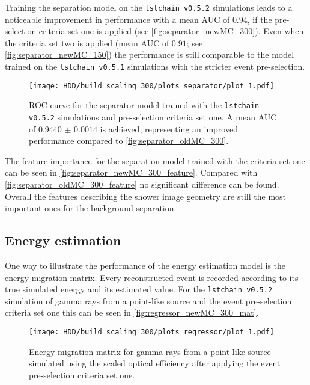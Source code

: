 Training the separation model on the \texttt{lstchain v0.5.2} simulations leads to a noticeable improvement in performance with a mean AUC of $\num{0.94}$, 
if the pre-selection criteria set one is applied (see \autoref{fig:separator_newMC_300}). 
Even when the criteria set two is applied (mean AUC of $\num{0.91}$; see \autoref{fig:separator_newMC_150}) 
the performance is still comparable to the model trained on the \texttt{lstchain v0.5.1} simulations with the stricter event pre-selection.
\begin{figure}
    \centering
    \texttt{[image: HDD/build\_scaling\_300/plots\_separator/plot\_1.pdf]}
    \caption{ROC curve for the separator model trained with the \texttt{lstchain v0.5.2} simulations and pre-selection criteria set one.
        A mean AUC of $\num{0.9440(14)}$ is achieved, representing an improved performance compared to \autoref{fig:separator_oldMC_300}.
    }
    \label{fig:separator_newMC_300}
\end{figure}

The feature importance for the separation model trained with the criteria set one can be seen in \autoref{fig:separator_newMC_300_feature}.
Compared with \autoref{fig:separator_oldMC_300_feature} no significant difference can be found.
Overall the features describing the shower image geometry are still the most important ones for the background separation.


\subsection{Energy estimation}
One way to illustrate the performance of the energy estimation model is the energy migration matrix.
Every reconstructed event is recorded according to its true simulated energy and its estimated value.
For the \texttt{lstchain v0.5.2} simulation of gamma rays from a point-like source and the event pre-selection criteria set one this can be seen in 
\autoref{fig:regressor_newMC_300_mat}.
\begin{figure}
    \centering
    \texttt{[image: HDD/build\_scaling\_300/plots\_regressor/plot\_1.pdf]}
    \caption{Energy migration matrix for gamma rays from a point-like source simulated using the scaled optical efficiency after applying the 
        event pre-selection criteria set one.
    }
    \label{fig:regressor_newMC_300_mat}
\end{figure}

